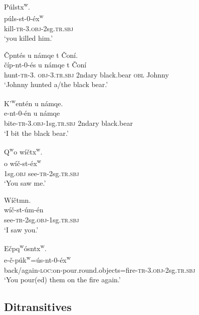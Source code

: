 \documentclass[output=paper,colorlinks,citecolor=brown]{langscibook}
\begin{document}
\ea
\label{ex-thomason-1}
\glll P\'ulstx\textsuperscript w.\\
      p\'uls-st-0-\'ex\textsuperscript w\\
      kill-\textsc{tr}-3.\textsc{obj}-2sg.\textsc{tr.sbj}\\
\glt `you killed him.'
\z

\ea
\label{ex-thomason-2}
\v{C}{\textltilde}pnt\'es {\textltilde}u n\textltilde\'amqe t \v{C}on\'i.\\
\gll \v{c}\textltilde\'ip-nt-0-\'es  {\textltilde}u n\textltilde\'amqe t \v{C}on\'i\\
     hunt-\textsc{tr}-3.\textsc{  obj}-3.\textsc{tr.sbj} 2ndary black.bear \textsc{obl} Johnny\\
\glt `Johnny hunted a/the black bear.'
\z

\ea 
\label{ex-thomason-3}
{K'\textsuperscript w}e{\textglotstop}nt\'en {\textltilde}u n\textltilde\'amqe.\\
e\textglotstop-nt-0-\'en             {\textltilde}u  n\textltilde\'amqe\\
     bite-\textsc{tr}-3.\textsc{obj}-1sg.\textsc{tr.sbj} 2ndary          black.bear\\
\glt `I bit the black bear.'
\z

\ea
\label{ex-thomason-4}
{Q\textsuperscript w}o w\'i\v{c}tx\textsuperscript w.\\
o w\'i\v{c}-st-\'ex\textsuperscript w\\
     1sg.\textsc{obj}       see-\textsc{tr}-2sg.\textsc{tr.sbj}\\  
\glt `You saw me.'
\z

\ea 
\label{ex-thomason-5}
W\'i\v{c}tmn.\\
\gll w\'i\v{c}-st-\'um-\'en\\
     see-\textsc{tr}-2sg.\textsc{obj}-1sg.\textsc{tr.sbj}\\
\glt `I saw you.'
\z

\ea 
\label{ex-thomason-6}
E\textltilde\v{c}pq\textsuperscript w\'osntx\textsuperscript w.\\
\gll e\textltilde-\v{c}-p\'uk\textsuperscript w=\'us-nt-0-\'ex\textsuperscript w\\
     back/again-\textsc{loc:}on-pour.round.objects=fire-\textsc{tr}-3.\textsc{obj}-2sg.\textsc{tr.sbj}\\  
\glt `You pour(ed) them on the fire again.'
\z

\subsection{Ditransitives}   %
\label{thomason_section_2.2}
\end{document}
